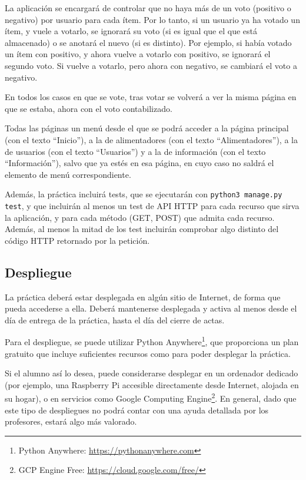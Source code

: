La aplicación se encargará de controlar que no haya más de un voto (positivo o negativo) por usuario para cada ítem. Por lo tanto, si un usuario ya ha votado un ítem, y vuele a votarlo, se ignorará su voto (si es igual que el que está almacenado) o se anotará el nuevo (si es distinto). Por ejemplo, si había votado un ítem con positivo, y ahora vuelve a votarlo con positivo, se ignorará el segundo voto. Si vuelve a votarlo, pero ahora con negativo, se cambiará el voto a negativo.

En todos los casos en que se vote, tras votar se volverá a ver la misma página en que se estaba, ahora con el voto contabilizado.

Todas las páginas un menú desde el que se podrá acceder a la página principal (con el texto ``Inicio''), a la de alimentadores (con el texto ``Alimentadores''), a la de usuarios (con el texto ``Usuarios'') y a la de información (con el texto ``Información''), salvo que ya estés en esa página, en cuyo caso no saldrá el elemento de menú correspondiente.

Además, la práctica incluirá tests, que se ejecutarán con \verb|python3 manage.py test|, y que incluirán al menos un test de API HTTP para cada recurso que sirva la aplicación, y para cada método (GET, POST) que admita cada recurso. Además, al menos la mitad de los test incluirán comprobar algo distinto del código HTTP retornado por la petición.

\subsection{Despliegue}
\label{sec:practica-2020-05:despliegue}

La práctica deberá estar desplegada en algún sitio de Internet, de forma que pueda accederse a ella. Deberá mantenerse desplegada y activa al menos desde el día de entrega de la práctica, hasta el día del cierre de actas.

Para el despliegue, se puede utilizar Python Anywhere\footnote{Python Anywhere: \url{https://pythonanywhere.com}}, que proporciona un plan gratuito que incluye suficientes recursos como para poder desplegar la práctica.

Si el alumno así lo desea, puede considerarse desplegar en un ordenador dedicado (por ejemplo, una Raspberry Pi accesible directamente desde Internet, alojada en su hogar), o en servicios como Google Computing Engine\footnote{GCP Engine Free: \url{https://cloud.google.com/free/}}. En general, dado que este tipo de despliegues no podrá contar con una ayuda detallada por los profesores, estará algo más valorado.


